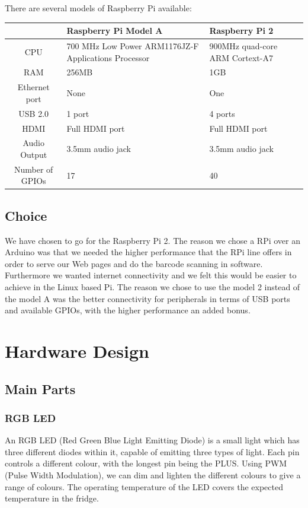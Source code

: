 \documentclass[10pt]{article}
\begin{document}
There are several models of Raspberry Pi available:

\begin{center}
	\begin{tabular}{| c | p{6cm} | p{6cm} |}
		\hline
		  & Raspberry Pi Model A & Raspberry Pi 2 \\ \hline
		CPU & 700 MHz Low Power ARM1176JZ-F Applications Processor & 900MHz quad-core ARM Cortext-A7 \\ \hline
		RAM & 256MB & 1GB \\ \hline
		Ethernet port & None & One \\ \hline
		USB 2.0 & 1 port & 4 ports \\ \hline
		HDMI & Full HDMI port & Full HDMI port \\ \hline
		Audio Output & 3.5mm audio jack & 3.5mm audio jack \\ \hline
		Number of GPIOs & 17 & 40 \\ \hline
	\end{tabular}
\end{center}

\subsection{Choice}
We have chosen to go for the Raspberry Pi 2. The reason we chose a RPi over an Arduino was that we needed the higher performance that the RPi line offers in order to serve our Web pages and do the barcode scanning in software. Furthermore we wanted internet connectivity and we felt this would be easier to achieve in the Linux based Pi. The reason we chose to use the model 2 instead of the model A was the better connectivity for peripherals in terms of USB ports and available GPIOs, with the higher performance an added bonus.

\newpage
\section{Hardware Design}
\subsection{Main Parts}
\subsubsection{RGB LED}

An RGB LED (Red Green Blue Light Emitting Diode) is a small light which has three different diodes within it, capable of emitting three types of light. Each pin controls a different colour, with the longest pin being the PLUS. Using PWM (Pulse Width Modulation), we can dim and lighten the different colours to give a range of colours. The operating temperature of the LED covers the expected temperature in the fridge.
\end{document}
